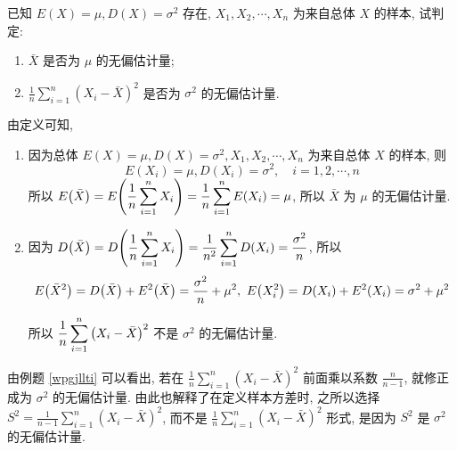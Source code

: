 \begin{example}
    已知 $E(X)=\mu, D(X)=\sigma^{2} $ 存在, $ X_{1}, X_{2}, \cdots, X_{n} $ 为来自总体 $ X $ 的样本, 试判定:\label{wpgjllti}
    \begin{enumerate}[label=(\arabic{*})]
        \item $\bar{X} $ 是否为 $ \mu $ 的无偏估计量;
        \item $\displaystyle\frac{1}{n} \sum_{i=1}^{n}\left(X_{i}-\bar{X}\right)^{2} $ 是否为 $ \sigma^{2} $ 的无偏估计量.
    \end{enumerate}
\end{example}
\begin{solution}
    由定义可知, 
    \begin{enumerate}[label=(\arabic{*})]
        \item 因为总体 $ E(X)=\mu, D(X)=\sigma^{2}, X_{1}, X_{2}, \cdots, X_{n} $ 为来自总体 $ X $ 的样本, 则
              $$E\left(X_{i}\right)=\mu, D\left(X_{i}\right)=\sigma^{2}, \quad i=1,2, \cdots, n $$
              所以 $\displaystyle E\qty(\bar{X})=E\qty(\dfrac{1}{n}\sum_{i=1}^{n}X_i)=\dfrac{1}{n}\sum_{i=1}^{n}E(X_i)=\mu$, 
              所以 $\bar{X} $ 为 $ \mu $ 的无偏估计量.
        \item 因为 $\displaystyle D\qty(\bar{X})=D\qty(\dfrac{1}{n}\sum_{i=1}^{n}X_i)=\dfrac{1}{n^2}\sum_{i=1}^{n}D(X_i)=\dfrac{\sigma^2}{n}$, 所以
              $$E\qty(\bar{X}^2)=D\qty(\bar{X})+E^2\qty(\bar{X})=\dfrac{\sigma^2}{n}+\mu^2,~E\qty(X_i^2)=D(X_i)+E^2(X_i)=\sigma^2+\mu^2$$
              所以 $\displaystyle\dfrac{1}{n}\sum_{i=1}^{n}\qty(X_i-\bar{X})^2$ 不是 $\sigma^2$ 的无偏估计量.
    \end{enumerate}
\end{solution}

由例题 \ref{wpgjllti} 可以看出, 若在 $ \displaystyle\frac{1}{n} \sum_{i=1}^{n}\left(X_{i}-\bar{X}\right)^{2} $ 前面乘以系数
$ \displaystyle\frac{n}{n-1} $, 就修正成为 $ \sigma^{2} $ 的无偏估计量.
由此也解释了在定义样本方差时, 之所以选择 $\displaystyle S^{2}=\frac{1}{n-1} \sum_{i=1}^{n}\left(X_{i}-\bar{X}\right)^{2}$, 
而不是 $\displaystyle \frac{1}{n} \sum_{i=1}^{n}\left(X_{i}-\bar{X}\right)^{2} $ 形式, 是因为 $ S^{2} $ 是 $ \sigma^{2} $ 的无偏估计量.

